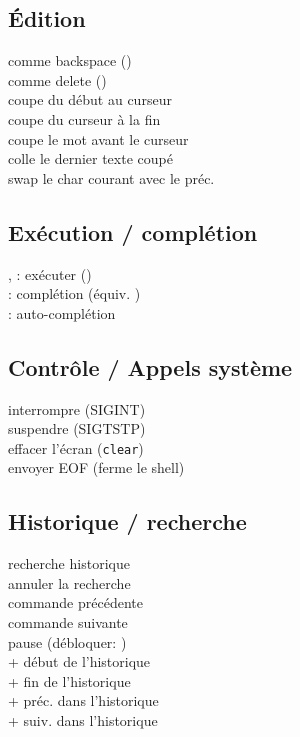 \documentclass[9pt]{extarticle}
\begin{document}
\begin{multicols}{4}
\subsection*{Édition}

 \quad comme backspace (\keys{\backspace}) \\
 \quad comme delete (\keys{\del}) \\
 \quad coupe du début au curseur \\
 \quad coupe du curseur à la fin \\
 \quad coupe le mot avant le curseur \\
 \quad colle le dernier texte coupé \\
 \quad swap le char courant avec le préc. \\

\subsection*{Exécution / complétion}

,  : exécuter (\keys{\return}) \\
 : complétion (équiv. \keys{\tab}) \\
\keys{\tab}{} : auto-complétion \\

\subsection*{Contrôle / Appels système}

 \quad interrompre (SIGINT) \\
 \quad suspendre (SIGTSTP) \\
 \quad effacer l'écran (\lstinline|clear|) \\
 \quad envoyer EOF (ferme le shell) \\

\subsection*{Historique / recherche}

 \quad recherche historique \\
 \quad annuler la recherche \\
 \quad commande précédente \\
 \quad commande suivante \\
 \quad pause (débloquer: ) \\
\keys{\Alt}+\keys{<} \quad début de l'historique \\
\keys{\Alt}+\keys{>} \quad fin de l'historique \\
\keys{\Alt}+ \quad préc. dans l'historique\\
\keys{\Alt}+ \quad suiv. dans l'historique \\


\end{multicols}
\end{document}
